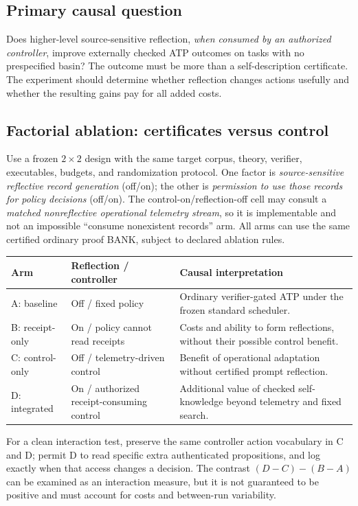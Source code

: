 \documentclass[11pt,letterpaper]{article}
\begin{document}
\subsection{Primary causal question}
Does higher-level source-sensitive reflection, \emph{when consumed by an authorized controller}, improve externally checked ATP outcomes on tasks with no prespecified basin? The outcome must be more than a self-description certificate. The experiment should determine whether reflection changes actions usefully and whether the resulting gains pay for all added costs.

\subsection{Factorial ablation: certificates versus control}
Use a frozen $2\times2$ design with the same target corpus, theory, verifier, executables, budgets, and randomization protocol. One factor is \emph{source-sensitive reflective record generation} (off/on); the other is \emph{permission to use those records for policy decisions} (off/on). The control-on/reflection-off cell may consult a \emph{matched nonreflective operational telemetry stream}, so it is implementable and not an impossible ``consume nonexistent records'' arm. All arms can use the same certified ordinary proof BANK, subject to declared ablation rules.
\begin{center}
\small
\begin{tabularx}{\linewidth}{@{}p{24mm}p{34mm}X@{}}
\toprule
Arm & Reflection / controller & Causal interpretation\\
\midrule
A: baseline & Off / fixed policy & Ordinary verifier-gated ATP under the frozen standard scheduler.\\
B: receipt-only & On / policy cannot read receipts & Costs and ability to form reflections, without their possible control benefit.\\
C: control-only & Off / telemetry-driven control & Benefit of operational adaptation without certified prompt reflection.\\
D: integrated & On / authorized receipt-consuming control & Additional value of checked self-knowledge beyond telemetry and fixed search.\\
\bottomrule
\end{tabularx}
\end{center}
For a clean interaction test, preserve the same controller action vocabulary in C and D; permit D to read specific extra authenticated propositions, and log exactly when that access changes a decision. The contrast $(D-C)-(B-A)$ can be examined as an interaction measure, but it is not guaranteed to be positive and must account for costs and between-run variability.
\end{document}
